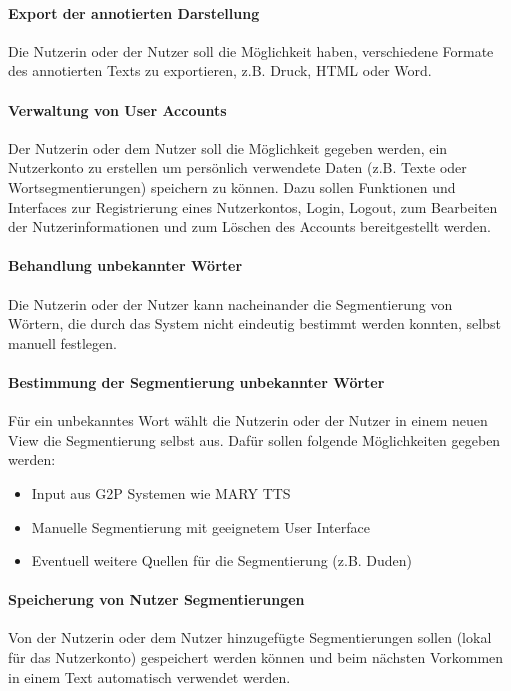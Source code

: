 \paragraph{Export der annotierten Darstellung}
Die Nutzerin oder der Nutzer soll die Möglichkeit haben, verschiedene Formate des annotierten Texts zu exportieren, z.B. Druck, HTML oder Word.

\paragraph{Verwaltung von User Accounts}
Der Nutzerin oder dem Nutzer soll die Möglichkeit gegeben werden, ein Nutzerkonto zu erstellen um persönlich verwendete Daten (z.B. Texte oder Wortsegmentierungen) speichern zu können. Dazu sollen Funktionen und Interfaces zur Registrierung eines Nutzerkontos, Login, Logout, zum Bearbeiten der Nutzerinformationen und zum Löschen des Accounts bereitgestellt werden.

\paragraph{Behandlung unbekannter Wörter}
Die Nutzerin oder der Nutzer kann nacheinander die Segmentierung von Wörtern, die durch das System nicht eindeutig bestimmt werden konnten, selbst manuell festlegen.

\paragraph{Bestimmung der Segmentierung unbekannter Wörter}
Für ein unbekanntes Wort wählt die Nutzerin oder der Nutzer in einem neuen View die Segmentierung selbst aus. Dafür sollen folgende Möglichkeiten gegeben werden:
\begin{itemize}
	\item Input aus G2P Systemen wie MARY TTS
	\item Manuelle Segmentierung mit geeignetem User Interface
	\item Eventuell weitere Quellen für die Segmentierung (z.B. Duden)
\end{itemize}

\paragraph{Speicherung von Nutzer Segmentierungen}
Von der Nutzerin oder dem Nutzer hinzugefügte Segmentierungen sollen (lokal für das Nutzerkonto) gespeichert werden können und beim nächsten Vorkommen in einem Text automatisch verwendet werden.


